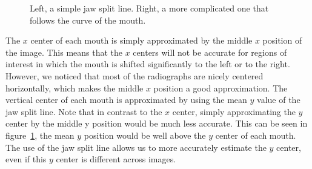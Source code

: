 \documentclass[a4paper]{article}
\begin{document}
\begin{figure}[!tbp]
    \centering
    \qquad
    \caption{Left, a simple jaw split line. Right, a more complicated one that follows the curve of the mouth.}
  \label{fig:jawSplitLine}
\end{figure}
\bigskip

The $x$ center of each mouth is simply approximated by the middle $x$ position of the image.
This means that the $x$ centers will not be accurate for regions of interest in which the mouth is shifted significantly to the left or to the right.
However, we noticed that most of the radiographs are nicely centered horizontally, which makes the middle $x$ position a good approximation.
The vertical center of each mouth is approximated by using the mean $y$ value of the jaw split line.
Note that in contrast to the $x$ center, simply approximating the $y$ center by the middle y position would be much less accurate.
This can be seen in figure~\ref{fig:jawSplitLine}, the mean $y$ position would be well above the $y$ center of each mouth.
The use of the jaw split line allows us to more accurately estimate the $y$ center, even if this $y$ center is different across images.
\end{document}
